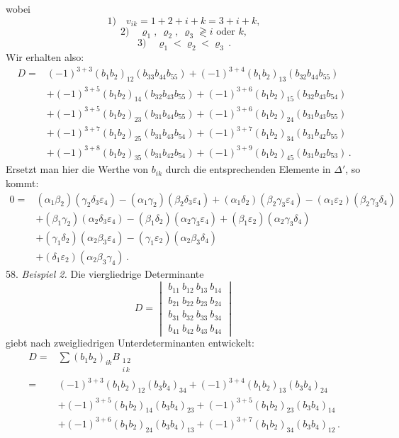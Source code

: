 \documentclass[11pt]{article}
\providecommand{\weberpage}[1]{}
\let\Delta\varDelta
\begin{document}
\weberpage{64}
wobei
\[
1)\quad v_{ik} = 1+2+i+k = 3+i+k,
\]
\[
2)\quad \varrho_1,\ \varrho_2,\ \varrho_3 \gtrless i \text{ oder } k,
\]
\[
3)\quad \varrho_1 < \varrho_2 < \varrho_3 \, .
\]
Wir erhalten also:
\[
\begin{aligned}
D = {}& (-1)^{3+3}(b_1b_2)_{12}(b_{33}b_{44}b_{55}) + (-1)^{3+4}(b_1b_2)_{13}(b_{32}b_{44}b_{55}) \\
& + (-1)^{3+5}(b_1b_2)_{14}(b_{32}b_{43}b_{55}) + (-1)^{3+6}(b_1b_2)_{15}(b_{32}b_{43}b_{54}) \\
& + (-1)^{3+5}(b_1b_2)_{23}(b_{31}b_{44}b_{55}) + (-1)^{3+6}(b_1b_2)_{24}(b_{31}b_{43}b_{55}) \\
& + (-1)^{3+7}(b_1b_2)_{25}(b_{31}b_{43}b_{54}) + (-1)^{3+7}(b_1b_2)_{34}(b_{31}b_{42}b_{55}) \\
& + (-1)^{3+8}(b_1b_2)_{35}(b_{31}b_{42}b_{54}) + (-1)^{3+9}(b_1b_2)_{45}(b_{31}b_{42}b_{53}) \, .
\end{aligned}
\]
Ersetzt man hier die Werthe von $b_{ik}$ durch die entsprechenden Elemente
in $\Delta'$, so kommt:
\[
\begin{aligned}
0 = {}& (\alpha_1\beta_2)(\gamma_2\delta_3\varepsilon_4) - (\alpha_1\gamma_2)(\beta_2\delta_3\varepsilon_4) + (\alpha_1\delta_2)(\beta_2\gamma_3\varepsilon_4) - (\alpha_1\varepsilon_2)(\beta_2\gamma_3\delta_4) \\
& + (\beta_1\gamma_2)(\alpha_2\delta_3\varepsilon_4) - (\beta_1\delta_2)(\alpha_2\gamma_3\varepsilon_4) + (\beta_1\varepsilon_2)(\alpha_2\gamma_3\delta_4) \\
& + (\gamma_1\delta_2)(\alpha_2\beta_3\varepsilon_4) - (\gamma_1\varepsilon_2)(\alpha_2\beta_3\delta_4) \\
& + (\delta_1\varepsilon_2)(\alpha_2\beta_3\gamma_4) \, .
\end{aligned}
\]
58. \textit{Beispiel 2.} Die viergliedrige Determinante
\[
D = \begin{vmatrix}
b_{11}\ b_{12}\ b_{13}\ b_{14} \\
b_{21}\ b_{22}\ b_{23}\ b_{24} \\
b_{31}\ b_{32}\ b_{33}\ b_{34} \\
b_{41}\ b_{42}\ b_{43}\ b_{44}
\end{vmatrix}
\]
giebt nach zweigliedrigen Unterdeterminanten entwickelt:
\[
\begin{aligned}
D = {}& \sum (b_1b_2)_{ik}B_{\substack{1\,2\\ i\,k}} \\
= {}& (-1)^{3+3}(b_1b_2)_{12}(b_3b_4)_{34} + (-1)^{3+4}(b_1b_2)_{13}(b_3b_4)_{24} \\
& + (-1)^{3+5}(b_1b_2)_{14}(b_3b_4)_{23} + (-1)^{3+5}(b_1b_2)_{23}(b_3b_4)_{14} \\
& + (-1)^{3+6}(b_1b_2)_{24}(b_3b_4)_{13} + (-1)^{3+7}(b_1b_2)_{34}(b_3b_4)_{12} \, .
\end{aligned}
\]
\end{document}
